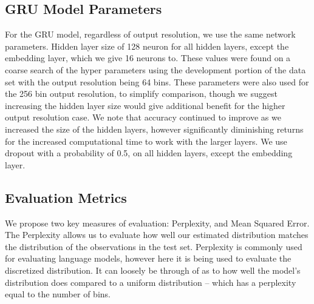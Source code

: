 \documentclass[11pt,letterpaper]{article}
\newcommand{\parencite}{\cite}
\begin{document}
\subsection{GRU Model Parameters}
For the GRU model, regardless of output resolution, we use the same network parameters.
Hidden layer size of 128 neuron for all hidden layers, except the embedding layer, which we give 16 neurons to.
These values were found on a coarse search of the hyper parameters using the development portion of the data set with the output resolution being 64 bins.
These parameters were also used for the 256 bin output resolution, to simplify comparison, though we suggest increasing the hidden layer size would give additional benefit for the higher output resolution case.
We note that accuracy continued to improve as  we increased the size of the hidden layers,
however significantly diminishing returns for the increased computational time to work with the larger layers.
We use dropout \parencite{srivastava2014dropout} with a probability of 0.5, on all hidden layers, except the embedding layer.


\subsection{Evaluation Metrics}
We propose two key measures of evaluation: Perplexity, and Mean Squared Error.
The Perplexity allows us to evaluate how well our estimated distribution matches the distribution of the observations in the test set.
Perplexity is commonly used for evaluating language models, however here it is being used to evaluate the discretized distribution.
It can loosely be through of as to how well the model's distribution does compared to a uniform distribution -- which has a perplexity equal to the number of bins.
\end{document}
